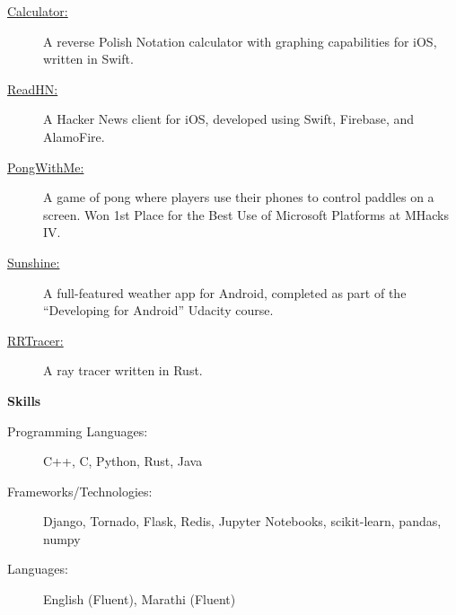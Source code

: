 \documentclass[letterpaper,11pt]{article}
\newcommand{\resheading}[1]{{\large \colorbox{mygrey}{\begin{minipage}{\textwidth}{\textbf{#1 \vphantom{p\^{E}}}}\end{minipage}}}}
\renewcommand{\footnotesize}{\fontsize{10pt}{11pt}\selectfont}
\begin{document}
		\begin{description}
			\item[\href{https://github.com/achiwhane/Calculator}{Calculator:}] 
				{
					\footnotesize
					A reverse Polish Notation calculator with graphing capabilities for iOS, written in Swift.
				}
			\item[\href{https://github.com/achiwhane/ReadHN}{ReadHN:}] 
				{
					\footnotesize
					A Hacker News client for iOS, developed using Swift, Firebase, and AlamoFire.
				}
			\item[\href{https://github.com/achiwhane/playpong}{PongWithMe:}]
				{
					\footnotesize
					A game of pong where players use their phones to control paddles on a screen. Won 1st Place for the Best Use of Microsoft Platforms at MHacks IV.
				}
				
			\item[\href{https://github.com/achiwhane/ud851-Sunshine}{Sunshine:}]
				{
					\footnotesize
					A full-featured weather app for Android, completed as part of the ``Developing for Android''  Udacity course.
				}
			\item[\href{https://github.com/achiwhane/rrtracer}{RRTracer:}]
				{
					\footnotesize
					A ray tracer written in Rust.
				}
				
		\end{description}
		
		\resheading{Skills}
		\begin{description}
			\item[Programming Languages:]
				{	
					\footnotesize
					C++, C, Python, Rust, Java
				}
			\item[Frameworks/Technologies:]
				{
					\footnotesize
					Django, Tornado, Flask, Redis, Jupyter Notebooks, scikit-learn, pandas, numpy
				}
			\item[Languages:]
				{
					\footnotesize
					English (Fluent), Marathi (Fluent)
				}
		\end{description} %
		
		
\end{document}

